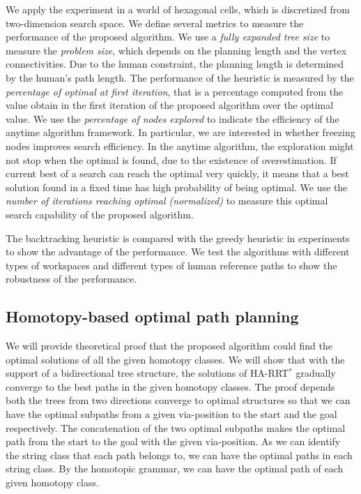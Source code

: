\documentclass[phd]{byuprop}
\begin{document}
We apply the experiment in a world of hexagonal cells, which is discretized from two-dimension search space.
We define several metrics to measure the performance of the proposed algorithm.
We use a \emph{fully expanded tree size} to measure the \emph{problem size}, which depends on the planning length and the vertex connectivities.
Due to the human constraint, the planning length is determined by the human's path length.
The performance of the heuristic is measured by the \emph{percentage of optimal at first iteration}, that is a percentage computed from the value obtain in the first iteration of the proposed algorithm over the optimal value.
We use the \emph{percentage of nodes explored} to indicate the efficiency of the anytime algorithm framework.
In particular, we are interested in whether freezing nodes improves search efficiency.
In the anytime algorithm, the exploration might not stop when the optimal is found, due to the existence of overestimation.
If current best of a search can reach the optimal very quickly, it means that a best solution found in a fixed time has high probability of being optimal.
We use the \emph{number of iterations reaching optimal (normalized)} to measure this optimal search capability of the proposed algorithm.

The backtracking heuristic is compared with the greedy heuristic in experiments to show the advantage of the performance.
We test the algorithms with different types of workspaces and different types of human reference paths to show the robustness of the performance.


\subsection{Homotopy-based optimal path planning}

We will provide theoretical proof that the proposed algorithm could find the optimal solutions of all the given homotopy classes.
We will show that with the support of a bidirectional tree structure, the solutions of HA-RRT$^{*}$ gradually converge to the best paths in the given homotopy classes.
The proof depends both the trees from two directions converge to optimal structures so that we can have the optimal subpaths from a given via-position to the start and the goal respectively.
The concatenation of the two optimal subpaths makes the optimal path from the start to the goal with the given via-position.
As we can identify the string class that each path belongs to, we can have the optimal paths in each string class.
By the homotopic grammar, we can have the optimal path of each given homotopy class.
\end{document}
